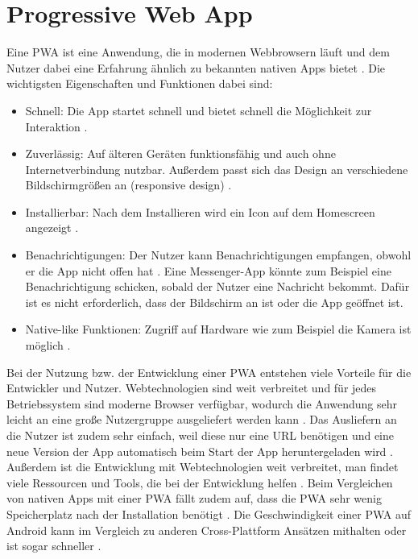 
\section{Progressive Web App}
Eine \ac{PWA} ist eine Anwendung, die in modernen Webbrowsern läuft und dem Nutzer dabei eine Erfahrung ähnlich zu bekannten nativen Apps bietet \autocite{Sheppard2017} \autocite{Rojas2020}. Die wichtigsten Eigenschaften und Funktionen dabei sind:

\begin{itemize}
  \item Schnell: Die App startet schnell und bietet schnell die Möglichkeit zur Interaktion \autocite{Hajian2019} \autocite{Sheppard2017}.
  \item Zuverlässig: Auf älteren Geräten funktionsfähig und auch ohne Internetverbindung nutzbar. Außerdem passt sich das Design an verschiedene Bildschirmgrößen an (responsive design) \autocite{Hajian2019} \autocite{Sheppard2017}.
  \item Installierbar: Nach dem Installieren wird ein Icon auf dem Homescreen angezeigt \autocite{Hajian2019} \autocite{Sheppard2017} \autocite{Rojas2020}.
  \item Benachrichtigungen: Der Nutzer kann Benachrichtigungen empfangen, obwohl er die App nicht offen hat \autocite{Hajian2019} \autocite{Sheppard2017}. Eine Messenger-App könnte zum Beispiel eine Benachrichtigung schicken, sobald der Nutzer eine Nachricht bekommt. Dafür ist es nicht erforderlich, dass der Bildschirm an ist oder die App geöffnet ist.
  \item Native-like Funktionen: Zugriff auf Hardware wie zum Beispiel die Kamera ist möglich \autocite{Hajian2019}.
\end{itemize}

Bei der Nutzung bzw. der Entwicklung einer \ac{PWA} entstehen viele Vorteile für die Entwickler und Nutzer. Webtechnologien sind weit verbreitet und für jedes Betriebssystem sind moderne Browser verfügbar, wodurch die Anwendung sehr leicht an eine große Nutzergruppe ausgeliefert werden kann \autocite{Rojas2020}. Das Ausliefern an die Nutzer ist zudem sehr einfach, weil diese nur eine URL benötigen \autocite{KHAN2019289} und eine neue Version der App automatisch beim Start der App heruntergeladen wird \autocite{Rojas2020}. Außerdem ist die Entwicklung mit Webtechnologien weit verbreitet, man findet viele Ressourcen und Tools, die bei der Entwicklung helfen \autocite{Rojas2020}. Beim Vergleichen von nativen Apps mit einer \ac{PWA} fällt zudem auf, dass die \ac{PWA} sehr wenig Speicherplatz nach der Installation benötigt \autocite{biorn2017} \autocite{KHAN2019289}. Die Geschwindigkeit einer \ac{PWA} auf Android kann im Vergleich zu anderen Cross-Plattform Ansätzen mithalten oder ist sogar schneller \autocite{biorn2017}.

